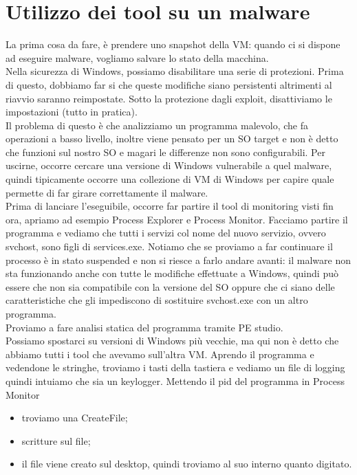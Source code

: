 \documentclass[12pt, oneside]{extbook}
\begin{document}
\section{Utilizzo dei tool su un malware}
La prima cosa da fare, è prendere uno snapshot della VM: quando ci si dispone ad eseguire malware, vogliamo salvare lo stato della macchina.\\ Nella sicurezza di Windows, possiamo disabilitare una serie di protezioni. Prima di questo, dobbiamo far si che queste modifiche siano persistenti altrimenti al riavvio saranno reimpostate. Sotto la protezione dagli exploit, disattiviamo le impostazioni (tutto in pratica).\\ Il problema di questo è che analizziamo un programma malevolo, che fa operazioni a basso livello, inoltre viene pensato per un SO target e non è detto che funzioni sul nostro SO e magari le differenze non sono configurabili. Per uscirne, occorre cercare una versione di Windows vulnerabile a quel malware, quindi tipicamente occorre una collezione di VM di Windows per capire quale permette di far girare correttamente il malware.\\ Prima di lanciare l'eseguibile, occorre far partire il tool di monitoring visti fin ora, apriamo ad esempio Process Explorer e Process Monitor. Facciamo partire il programma e vediamo che tutti i servizi col nome del nuovo servizio, ovvero svchost, sono figli di services.exe. Notiamo che se proviamo a far continuare il processo è in stato suspended e non si riesce a farlo andare avanti: il malware non sta funzionando anche con tutte le modifiche effettuate a Windows, quindi può essere che non sia compatibile con la versione del SO oppure che ci siano delle caratteristiche che gli impediscono di sostituire svchost.exe con un altro programma.\\ Proviamo a fare analisi statica del programma tramite PE studio.\\ Possiamo spostarci su versioni di Windows più vecchie, ma qui non è detto che abbiamo tutti i tool che avevamo sull'altra VM. Aprendo il programma e vedendone le stringhe, troviamo i tasti della tastiera e vediamo un file di logging quindi intuiamo che sia un keylogger. Mettendo il pid del programma in Process Monitor
\begin{itemize}
\item troviamo una CreateFile;
\item scritture sul file;
\item il file viene creato sul desktop, quindi troviamo al suo interno quanto digitato.
\end{itemize}
\end{document}

